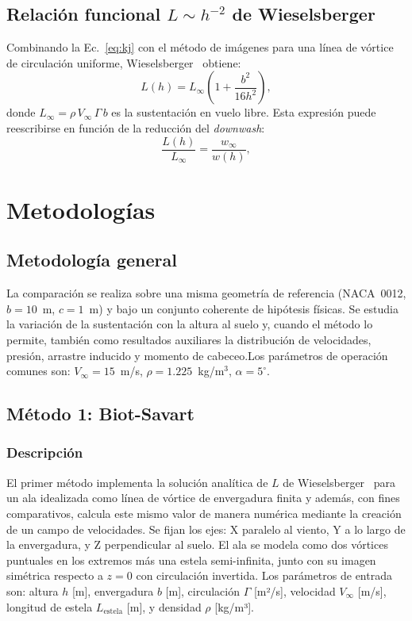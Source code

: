 \documentclass[twocolumn]{article}
\begin{document}
\subsection{Relación funcional $L \sim h^{-2}$ de Wieselsberger}

Combinando la Ec.~\eqref{eq:kj} con el método de imágenes para una línea de
vórtice de circulación uniforme, Wieselsberger~\cite{wieselsberger1922} obtiene:
\begin{equation}
  L(h) = L_\infty \left(1 + \frac{b^2}{16h^2}\right),
  \label{eq:wieselsberger}
\end{equation}
donde $L_\infty = \rho\,V_\infty\,\Gamma\,b$ es la sustentación en vuelo libre.
Esta expresión puede reescribirse en función de la reducción del
\textit{downwash}:
\begin{equation}
  \frac{L(h)}{L_\infty} = \frac{w_\infty}{w(h)},
  \label{eq:prop_w}
\end{equation}

\section{Metodologías}

\subsection{Metodología general}
La comparación se realiza sobre una misma geometría de referencia (NACA~0012, $b = 10$~m, $c = 1$~m) y bajo un conjunto coherente de hipótesis físicas. Se estudia la variación de la sustentación con la altura al suelo y, cuando el método lo permite, también como resultados auxiliares la distribución de velocidades, presión, arrastre inducido y momento de cabeceo.Los parámetros de operación comunes son: $V_\infty = 15$~m/s,
$\rho = 1.225$~kg/m$^3$, $\alpha = 5^\circ$.

\subsection{Método 1: Biot-Savart}

\subsubsection{Descripción}

El primer método implementa la solución analítica de $L$ de Wieselsberger~\cite{wieselsberger1922} para un ala idealizada como línea de vórtice de envergadura finita y además, con fines comparativos, calcula este mismo valor de manera numérica mediante la creación de un campo de velocidades. Se fijan los ejes: X paralelo al viento, Y a lo largo de la envergadura, y Z perpendicular al suelo. El ala se modela como dos vórtices puntuales en los extremos más una estela semi-infinita, junto con su imagen simétrica respecto a $z = 0$ con circulación invertida. Los parámetros de entrada son: altura $h$ [m], envergadura $b$ [m], circulación $\Gamma$ [m²/s], velocidad $V_\infty$ [m/s], longitud de estela $L_{\text{estela}}$ [m], y densidad $\rho$ [kg/m³].
\end{document}
